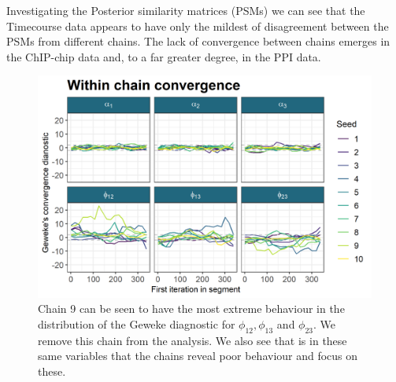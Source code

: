 \documentclass[]{article}
\begin{document}
Investigating the Posterior similarity matrices (PSMs) we can see that the Timecourse data appears to have only the mildest of disagreement between the PSMs from different chains. The lack of convergence between chains emerges in the ChIP-chip data and, to a far greater degree, in the PPI data.

\begin{figure}
	\centering
	\includegraphics[scale=1.0]{./Images/Yeast/Convergence/gewekePlot.png}
	\caption{Chain 9 can be seen to have the most extreme behaviour in the distribution of the Geweke diagnostic for $\phi_{12}, \phi_{13}$ and $\phi_{23}$. We remove this chain from the analysis. We also see that is in these same variables that the chains reveal poor behaviour and focus on these.}
	\label{fig:gewekePlot}
\end{figure}
\end{document}
